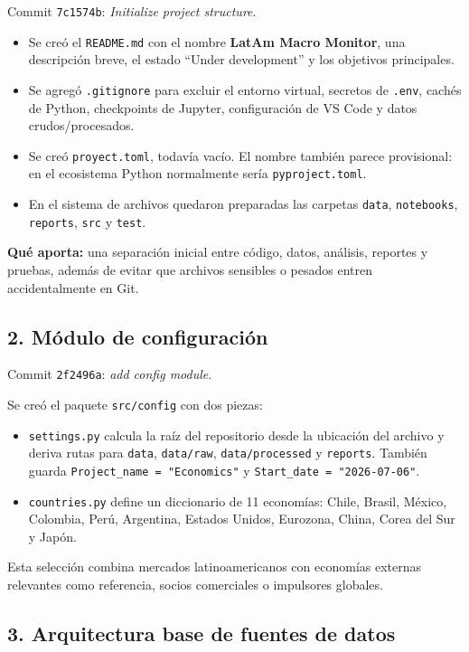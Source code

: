 \documentclass[11pt,a4paper]{article}
\newcommand{\code}[1]{\texttt{#1}}
\begin{document}
Commit \code{7c1574b}: \emph{Initialize project structure}.

\begin{itemize}
  \item Se creó el \code{README.md} con el nombre \textbf{LatAm Macro Monitor}, una descripción breve, el estado ``Under development'' y los objetivos principales.
  \item Se agregó \code{.gitignore} para excluir el entorno virtual, secretos de \code{.env}, cachés de Python, checkpoints de Jupyter, configuración de VS Code y datos crudos/procesados.
  \item Se creó \code{proyect.toml}, todavía vacío. El nombre también parece provisional: en el ecosistema Python normalmente sería \code{pyproject.toml}.
  \item En el sistema de archivos quedaron preparadas las carpetas \code{data}, \code{notebooks}, \code{reports}, \code{src} y \code{test}.
\end{itemize}

\textbf{Qué aporta:} una separación inicial entre código, datos, análisis, reportes y pruebas, además de evitar que archivos sensibles o pesados entren accidentalmente en Git.

\subsection{2. Módulo de configuración}

Commit \code{2f2496a}: \emph{add config module}.

Se creó el paquete \code{src/config} con dos piezas:

\begin{itemize}
  \item \code{settings.py} calcula la raíz del repositorio desde la ubicación del archivo y deriva rutas para \code{data}, \code{data/raw}, \code{data/processed} y \code{reports}. También guarda \code{Project\_name = "Economics"} y \code{Start\_date = "2026-07-06"}.
  \item \code{countries.py} define un diccionario de 11 economías: Chile, Brasil, México, Colombia, Perú, Argentina, Estados Unidos, Eurozona, China, Corea del Sur y Japón.
\end{itemize}

Esta selección combina mercados latinoamericanos con economías externas relevantes como referencia, socios comerciales o impulsores globales.

\subsection{3. Arquitectura base de fuentes de datos}
\end{document}
